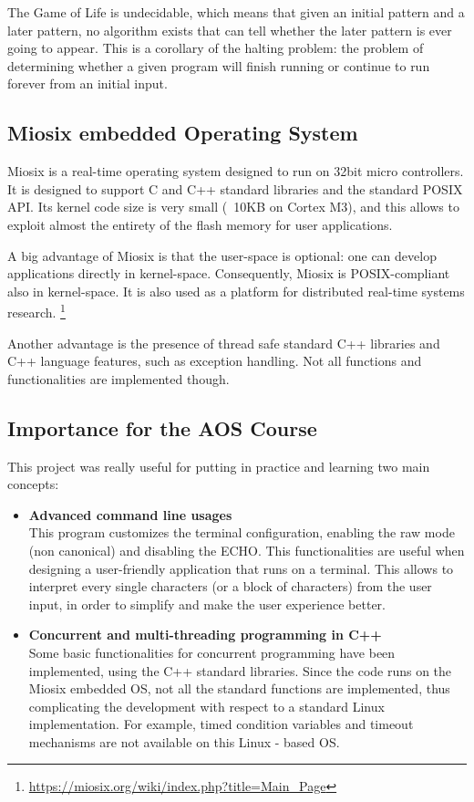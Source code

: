 \documentclass[10pt]{article}
\begin{document}
    The Game of Life is undecidable, which means that given an initial pattern and a later pattern, no algorithm exists that can tell whether the later pattern is ever going to appear.
    This is a corollary of the halting problem: the problem of determining whether a given program will finish running or continue to run forever from an initial input.

    \subsection{Miosix embedded Operating System}
    Miosix is a real-time operating system designed to run on 32bit micro controllers.
    It is designed to support C and C++ standard libraries and the standard POSIX API. Its kernel code size is very small (~10KB on Cortex M3), and this
    allows to exploit almost the entirety of the flash memory for user applications.

    A big advantage of Miosix is that the user-space is optional: one can develop applications directly in kernel-space. Consequently, Miosix is POSIX-compliant also in kernel-space. It is also used as a platform for distributed real-time systems research. \footnote{\url{https://miosix.org/wiki/index.php?title=Main\_Page}}

    Another advantage is the presence of thread safe standard C++ libraries and C++ language features, such as exception handling. Not all functions and functionalities are implemented though.

    \subsection{Importance for the AOS Course}

    This project was really useful for putting in practice and learning two main concepts:
    \begin{itemize}
        \item \textbf{Advanced command line usages}\\
        This program customizes the terminal configuration, enabling the raw mode (non canonical) and disabling the ECHO. This functionalities are useful
        when designing a user-friendly application that runs on a terminal. This allows to interpret every single characters (or a block of characters) from the user
        input, in order to simplify and make the user experience better.

        \item \textbf{Concurrent and multi-threading programming in C++}\\
        Some basic functionalities for concurrent programming have been implemented, using the C++ standard libraries.
        Since the code runs on the Miosix embedded OS, not all the standard functions are implemented, thus complicating the development with respect to a standard Linux implementation. For example, timed condition variables and timeout mechanisms are not available on this Linux - based OS.
    \end{itemize}
\end{document}
